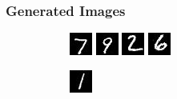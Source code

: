\documentclass[12pt, fleqn, titlepage]{article}
\newcommand\skipperer{0.45pt}
\newcommand\ripperer{1.25pt}
\begin{document}
\subsubsection{Generated Images}
\begin{figure}[H]
	\centering
	\begin{subfigure}[b]{0.7\textwidth}
		\centering
		\includegraphics[width=0.22\linewidth]{imgs/MNIST_GAN_normal_real_0}
		\hskip\skipperer
		\includegraphics[width=0.22\linewidth]{imgs/MNIST_GAN_normal_fake_0}
		\hskip\skipperer
		\includegraphics[width=0.22\linewidth]{imgs/MNIST_GAN_normal_real_1}
		\hskip\skipperer
		\includegraphics[width=0.22\linewidth]{imgs/MNIST_GAN_normal_fake_1}
	\end{subfigure}
	\vskip\ripperer
	\begin{subfigure}[b]{0.7\textwidth}
		\centering
		\includegraphics[width=0.22\linewidth]{imgs/MNIST_GAN_normal_real_2}
		\hskip\skipperer

\end{subfigure}
\end{figure}
\end{document}
